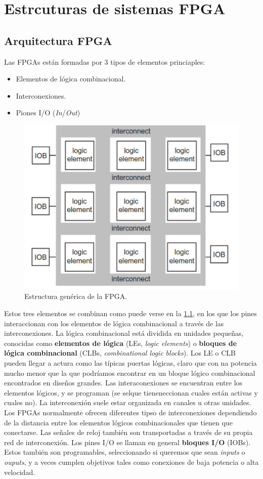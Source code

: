 \chapter{Estrcuturas de sistemas FPGA}

\section{Arquitectura FPGA}

Las FPGAs están formadas por 3 tipos de elementos princiaples: 

\begin{itemize}
    \item Elementos de lógica combinacional.
    \item Interconexiones.
    \item Piones I/O (\textit{In}/\textit{Out})
\end{itemize}
\begin{figure}[H] \centering
    \includegraphics[width=0.6\linewidth]{Imagenes/03-FPGA_Fabrics.png} 
    \caption{Estructura genérica de la FPGA.}   
    \label{Fig:03-FPGA_Fabric}
\end{figure}
Estos tres elementos se combinan como puede verse en la \cref{Fig:03-FPGA_Fabric}, en los que los pines interaccionan con los elementos de lógica combinacional a través de las interconexiones. La lógica combinacional está dividida en unidades pequeñas, conocidas como \textbf{elementos de lógica} (LEs, \textit{logic elements}) o \textbf{bloques de lógica combinacional} (CLBs, \textit{combinational logic blocks}). Los LE o CLB pueden llegar a actura como las típicas puertas lógicas, claro que con na potencia mucho menor que la que podríamos encontrar en un bloque lógico combinacional encontrados en diseños grandes. Las interaconexiones se encuentran entre los elementos lógicos, y se programan (se selque tieneneccionan cuales están activas y cuales no). La interconexión suele estar organizada en canales u otras unidades. Los FPGAs normalmente ofrecen diferentes tipso de interconexiones dependiendo de la distancia entre los elementos lógicos combinacionales que tienen que conectarse. Las señales de reloj también son transportadas a través de su propia red de interconexión. Los pines I/O se llaman en general \textbf{bloques I/O} (IOBs). Estos también son programables, seleccionando si queremos que sean \textit{inputs} o \textit{ouputs}, y a veces cumplen objetivos tales como conexiones de baja potencia o alta velocidad. 

